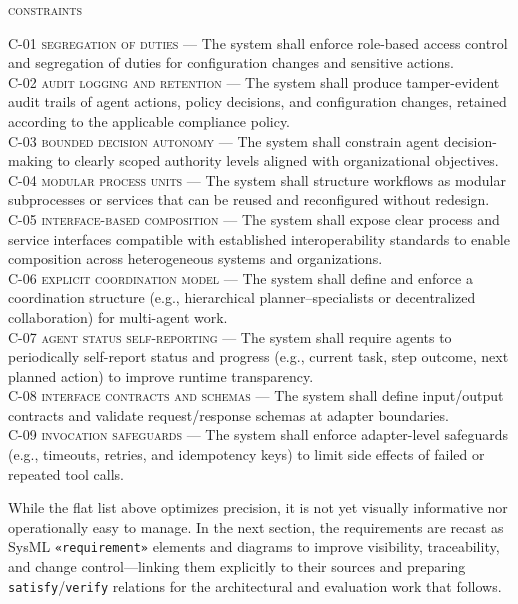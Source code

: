 \noindent \textsc{constraints} \\
\begin{footnotesize}
\noindent \textsc{C-01 segregation of duties} --- The system shall enforce role-based access control and segregation of duties for configuration changes and sensitive actions. \\
\noindent \textsc{C-02 audit logging and retention} --- The system shall produce tamper-evident audit trails of agent actions, policy decisions, and configuration changes, retained according to the applicable compliance policy. \\
\noindent \textsc{C-03 bounded decision autonomy} --- The system shall constrain agent decision-making to clearly scoped authority levels aligned with organizational objectives. \\
\noindent \textsc{C-04 modular process units} --- The system shall structure workflows as modular subprocesses or services that can be reused and reconfigured without redesign. \\
\noindent \textsc{C-05 interface-based composition} --- The system shall expose clear process and service interfaces compatible with established interoperability standards to enable composition across heterogeneous systems and organizations. \\
\noindent \textsc{C-06 explicit coordination model} --- The system shall define and enforce a coordination structure (e.g., hierarchical planner–specialists or decentralized collaboration) for multi-agent work. \\
\noindent \textsc{C-07 agent status self-reporting} --- The system shall require agents to periodically self-report status and progress (e.g., current task, step outcome, next planned action) to improve runtime transparency. \\
\noindent \textsc{C-08 interface contracts and schemas} --- The system shall define input/output contracts and validate request/response schemas at adapter boundaries. \\
\noindent \textsc{C-09 invocation safeguards} --- The system shall enforce adapter-level safeguards (e.g., timeouts, retries, and idempotency keys) to limit side effects of failed or repeated tool calls.
\end{footnotesize}

While the flat list above optimizes precision, it is not yet visually informative nor operationally easy to manage. In the next section, the requirements are recast as SysML \texttt{«requirement»} elements and diagrams to improve visibility, traceability, and change control—linking them explicitly to their sources and preparing \texttt{satisfy}/\texttt{verify} relations for the architectural and evaluation work that follows.

